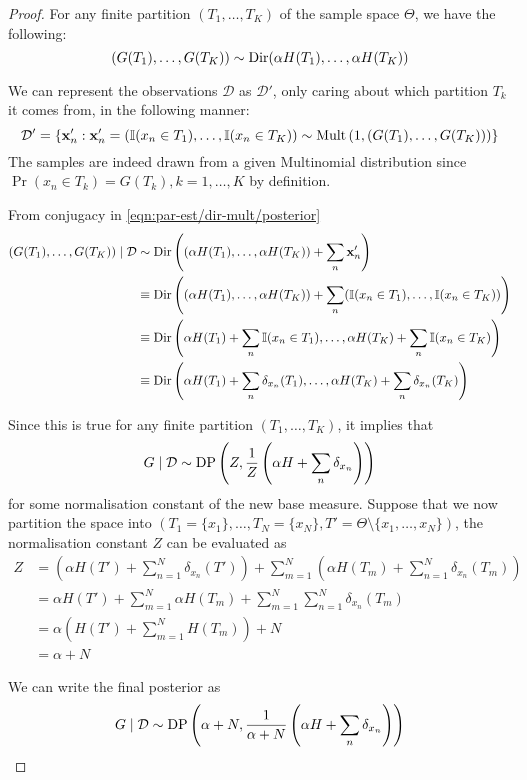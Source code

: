 \begin{proof}
	For any finite partition $(T_1, \dotsc, T_K)$ of the sample space $\Theta$, we have the following:
	\begin{equation*}
		(G(T_1), \dotsc, G(T_K)) \sim \operatorname{Dir}(\alpha H(T_1), \dotsc, \alpha H(T_K))
	\end{equation*}
	
	We can represent the observations $\mathcal D$ as $\mathcal D'$, only caring about which partition $T_k$ it comes from, in the following manner:
	\begin{equation*}
		\mathcal D' = \left\{\boldsymbol{\mathbf{x}}'_n : \boldsymbol{\mathbf{x}}'_n = \left(\operatorname{\mathbb I}(x_n \in T_1), \dotsc, \operatorname{\mathbb I}(x_n \in T_K)\right) \sim \operatorname{Mult}\left(1, (G(T_1), \dotsc, G(T_K))\right)\right\}
	\end{equation*}
	The samples are indeed drawn from a given Multinomial distribution since $\Pr(x_n \in T_k) = G(T_k), k = 1, \dotsc, K$ by definition.

	From conjugacy in \eqref{eqn:par-est/dir-mult/posterior}
	\begin{align*}
		(G(T_1), \dotsc, G(T_K)) \mid \mathcal D 	&\sim \operatorname{Dir}\left((\alpha H(T_1), \dotsc, \alpha H(T_K)) + \sum_n \boldsymbol{\mathbf{x}}'_n\right) \\
													&\equiv \operatorname{Dir}\left((\alpha H(T_1), \dotsc, \alpha H(T_K)) + \sum_n (\operatorname{\mathbb I}(x_n \in T_1), \dotsc, \operatorname{\mathbb I}(x_n \in T_K))\right) \\
													&\equiv \operatorname{Dir}\left(\alpha H(T_1) + \sum_n \operatorname{\mathbb I}(x_n \in T_1), \dotsc, \alpha H(T_K) + \sum_n \operatorname{\mathbb I}(x_n \in T_K)\right) \\
													&\equiv \operatorname{Dir}\left(\alpha H(T_1) + \sum_n \delta_{x_n} (T_1), \dotsc, \alpha H(T_K) + \sum_n \delta_{x_n} (T_K)\right) \\
	\end{align*}

	Since this is true for any finite partition $(T_1, \dotsc, T_K)$, it implies that
	\begin{equation*}
		G \mid \mathcal D \sim \operatorname{DP}\left(Z, \frac{1}{Z} \left(\alpha H + \sum_n \delta_{x_n}\right)\right)
	\end{equation*}
	for some normalisation constant of the new base measure. Suppose that we now partition the space into $\left(T_1 = \{x_1\}, \dotsc, T_N = \{x_N\}, T' = \Theta \setminus \{x_1, \dotsc, x_N\}\right)$, the normalisation constant $Z$ can be evaluated as
	\begin{align*}
		Z 	&= \left(\alpha H(T') + \sum_{n = 1}^N \delta_{x_n}(T')\right) + \sum_{m = 1}^N \left(\alpha H(T_m) + \sum_{n = 1}^N \delta_{x_n}(T_m)\right) \\
			&= \alpha H(T') + \sum_{m = 1}^N \alpha H(T_m) + \sum_{m = 1}^N \sum_{n = 1}^N \delta_{x_n}(T_m) \\
			&= \alpha \left(H(T') + \sum_{m = 1}^N H(T_m)\right) + N \\
			&= \alpha + N
	\end{align*}

	We can write the final posterior as
	\begin{equation*}
		G \mid \mathcal D \sim \operatorname{DP}\left(\alpha + N, \frac{1}{\alpha + N} \left(\alpha H + \sum_n \delta_{x_n}\right)\right)
	\end{equation*}
\end{proof}

